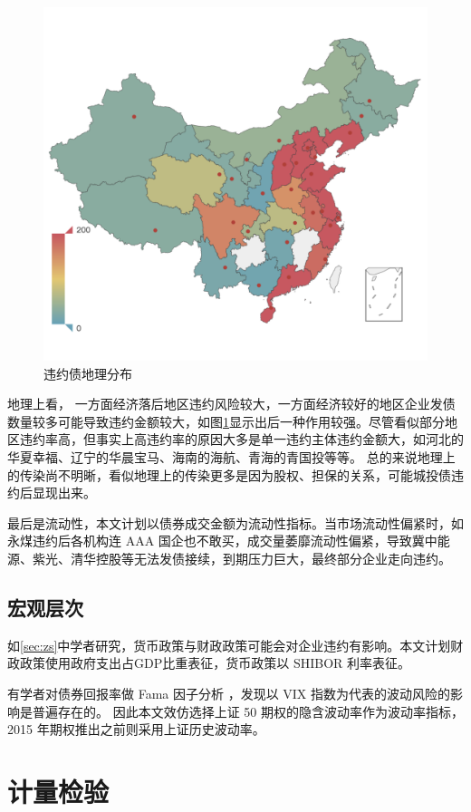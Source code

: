 \begin{figure}[htbp]
	\centering
	\includegraphics[width=.9\linewidth]{./data/default_by_geo.png}
	\caption{\label{fig:geo}违约债地理分布}
\end{figure}
地理上看，
一方面经济落后地区违约风险较大，一方面经济较好的地区企业发债数量较多可能导致违约金额较大，如图\ref{fig:geo}显示出后一种作用较强。尽管看似部分地区违约率高，但事实上高违约率的原因大多是单一违约主体违约金额大，如河北的华夏幸福、辽宁的华晨宝马、海南的海航、青海的青国投等等。
总的来说地理上的传染尚不明晰，看似地理上的传染更多是因为股权、担保的关系，可能城投债违约后显现出来。

最后是流动性，本文计划以债券成交金额为流动性指标。当市场流动性偏紧时，如永煤违约后各机构连 AAA 国企也不敢买，成交量萎靡流动性偏紧，导致冀中能源、紫光、清华控股等无法发债接续，到期压力巨大，最终部分企业走向违约。
\subsection{宏观层次}
如\ref{sec:zs}中学者研究，货币政策与财政政策可能会对企业违约有影响。本文计划财政政策使用政府支出占GDP比重表征，货币政策以 SHIBOR 利率表征。

有学者对债券回报率做 Fama 因子分析
\cite{chung2019volatility}
，发现以 VIX 指数为代表的波动风险的影响是普遍存在的。
因此本文效仿选择上证 50 期权的隐含波动率作为波动率指标，2015 年期权推出之前则采用上证历史波动率。

\section{计量检验}
